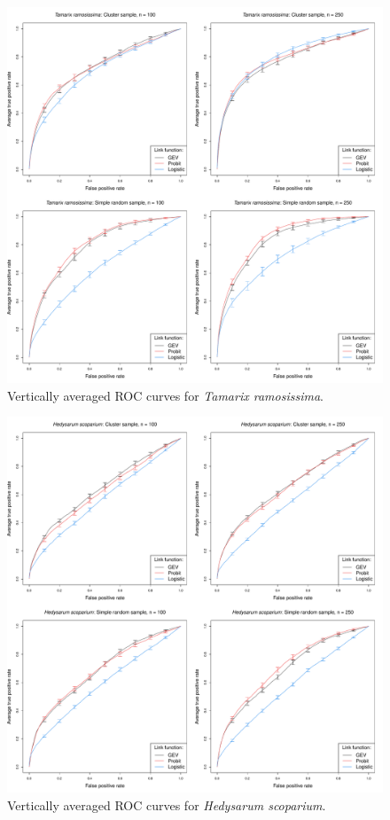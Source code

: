 \documentclass[11pt]{article}
\begin{document}
\begin{figure}
  \includegraphics[width=\linewidth]{plots/data-perf-species1}
  \caption{Vertically averaged ROC curves for \emph{Tamarix ramosissima}.}
  \label{rbfig:data1roc}
\end{figure}

\begin{figure}
  \includegraphics[width=\linewidth]{plots/data-perf-species2}
  \caption{Vertically averaged ROC curves for \emph{Hedysarum scoparium}.}
  \label{rbfig:data2roc}
\end{figure}
\end{document}
